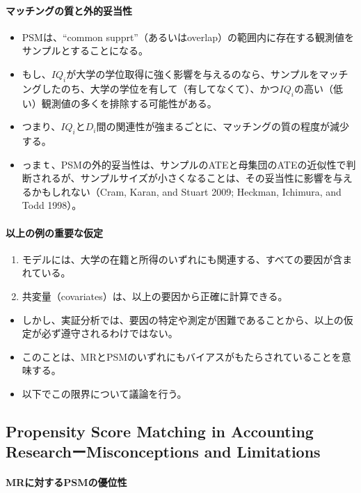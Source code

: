 \paragraph{マッチングの質と外的妥当性}

\begin{itemize}
 \item PSMは、“common supprt”（あるいはoverlap）の範囲内に存在する観測値をサンプルとすることになる。
 \item もし、$IQ_i$が大学の学位取得に強く影響を与えるのなら、サンプルをマッチングしたのち、大学の学位を有して（有してなくて）、かつ$IQ_i$の高い（低い）観測値の多くを排除する可能性がある。
 \item つまり、$IQ_i$と$D_i$間の関連性が強まるごとに、マッチングの質の程度が減少する。
 \item っまｔ、PSMの外的妥当性は、サンプルのATEと母集団のATEの近似性で判断されるが、サンプルサイズが小さくなることは、その妥当性に影響を与えるかもしれない（Cram, Karan, and Stuart 2009; Heckman, Ichimura, and Todd 1998）。
\end{itemize}
 
\paragraph{以上の例の重要な仮定}

\begin{enumerate}
 \item モデルには、大学の在籍と所得のいずれにも関連する、すべての要因が含まれている。
 \item 共変量（covariates）は、以上の要因から正確に計算できる。
\end{enumerate}
\begin{itemize}
 \item しかし、実証分析では、要因の特定や測定が困難であることから、以上の仮定が必ず遵守されるわけではない。
 \item このことは、MRとPSMのいずれにもバイアスがもたらされていることを意味する。
 \item 以下でこの限界について議論を行う。
\end{itemize}

\subsection*{Propensity Score Matching in Accounting ResearchーMisconceptions and Limitations}

\paragraph{MRに対するPSMの優位性}

